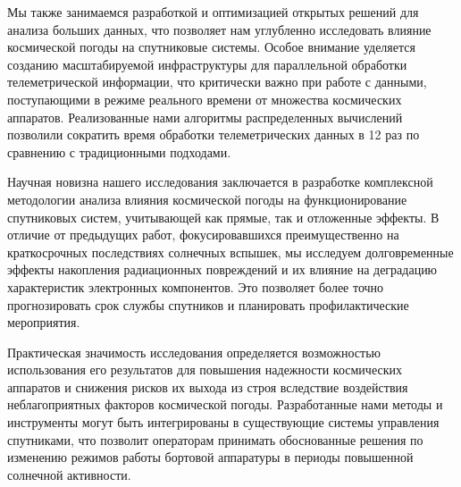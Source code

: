 Мы также занимаемся разработкой и оптимизацией открытых решений для анализа
больших данных, что позволяет нам углубленно исследовать влияние космической
погоды на спутниковые системы. Особое внимание уделяется созданию масштабируемой
инфраструктуры для параллельной обработки телеметрической информации, что
критически важно при работе с данными, поступающими в режиме реального времени
от множества космических аппаратов. Реализованные нами алгоритмы распределенных
вычислений позволили сократить время обработки телеметрических данных в 12 раз
по сравнению с традиционными подходами.

Научная новизна нашего исследования заключается в разработке комплексной
методологии анализа влияния космической погоды на функционирование спутниковых
систем, учитывающей как прямые, так и отложенные эффекты. В отличие от
предыдущих работ, фокусировавшихся преимущественно на краткосрочных последствиях
солнечных вспышек, мы исследуем долговременные эффекты накопления радиационных
повреждений и их влияние на деградацию характеристик электронных компонентов.
Это позволяет более точно прогнозировать срок службы спутников и планировать
профилактические мероприятия.

Практическая значимость исследования определяется возможностью использования его
результатов для повышения надежности космических аппаратов и снижения рисков их
выхода из строя вследствие воздействия неблагоприятных факторов космической
погоды. Разработанные нами методы и инструменты могут быть интегрированы в
существующие системы управления спутниками, что позволит операторам принимать
обоснованные решения по изменению режимов работы бортовой аппаратуры в периоды
повышенной солнечной активности.
